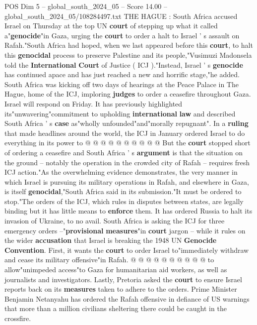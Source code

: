 \begin{textsample}{POS Dim 5 – global\_south\_2024\_05 – Score 14.00 – global\_south\_2024\_05/108284497.txt}  \label{ex:f5_pos_080}
THE HAGUE : South Africa accused Israel on Thursday at the top UN \textbf{court} of stepping up what it called a"\textbf{genocide}"in Gaza, urging the \textbf{court} to order a halt to Israel ' s assault on Rafah."South Africa had hoped, when we last appeared before this \textbf{court}, to halt this \textbf{genocidal} process to preserve Palestine and its people,"Vusimuzi Madonsela told the \textbf{International} \textbf{Court} of Justice ( ICJ )."Instead, Israel ' s \textbf{genocide} has continued apace and has just reached a new and horrific stage,"he added.
South Africa was kicking off two days of hearings at the Peace Palace in The Hague, home of the ICJ, imploring \textbf{judges} to order a ceasefire throughout Gaza.
Israel will respond on Friday.
It has previously highlighted its"unwavering"commitment to upholding \textbf{international} \textbf{law} and described South Africa ' s \textbf{case} as"wholly unfounded"and"morally repugnant".
In a \textbf{ruling} that made headlines around the world, the ICJ in January ordered Israel to do everything in its power to @ @ @ @ @ @ @ @ @ @ But the \textbf{court} stopped short of ordering a ceasefire and South Africa ' s \textbf{argument} is that the situation on the ground -- notably the operation in the crowded city of Rafah -- requires fresh ICJ action."As the overwhelming evidence demonstrates, the very manner in which Israel is pursuing its military operations in Rafah, and elsewhere in Gaza, is itself \textbf{genocidal},"South Africa said in its submission."It must be ordered to stop."The orders of the ICJ, which rules in disputes between states, are legally binding but it has little means to \textbf{enforce} them.
It has ordered Russia to halt its invasion of Ukraine, to no avail.
South Africa is asking the ICJ for three emergency orders --"\textbf{provisional} \textbf{measures}"in \textbf{court} jargon -- while it rules on the wider \textbf{accusation} that Israel is breaking the 1948 UN \textbf{Genocide} \textbf{Convention}.
First, it wants the \textbf{court} to order Israel to"immediately withdraw and cease its military offensive"in Rafah. @ @ @ @ @ @ @ @ @ @ to allow"unimpeded access"to Gaza for humanitarian aid workers, as well as journalists and investigators.
Lastly, Pretoria asked the \textbf{court} to ensure Israel reports back on its \textbf{measures} taken to adhere to the orders.
Prime Minister Benjamin Netanyahu has ordered the Rafah offensive in defiance of US warnings that more than a million civilians sheltering there could be caught in the crossfire.

\end{textsample}
